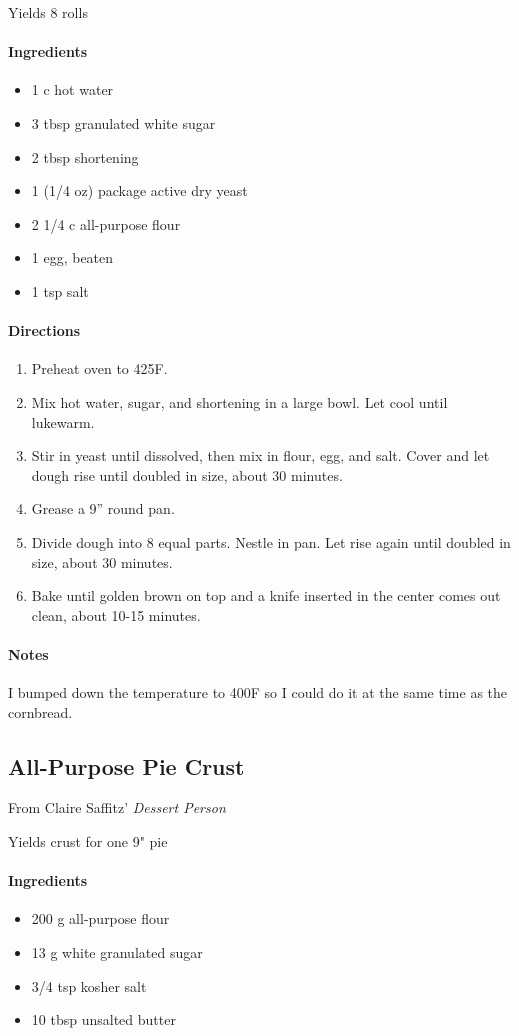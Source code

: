 \documentclass[12pt]{article}
\newenvironment*{ingredients}
	{
		\paragraph*{Ingredients}
		\begin{itemize}
	}
	{
		\end{itemize}
	}
\newenvironment*{directions}
	{
		\paragraph*{Directions}
		\begin{enumerate}
	}
	{
		\end{enumerate}
	}
\newenvironment*{notes}
	{
		\paragraph*{Notes}
		\begin{adjustwidth}{1cm}{}
	}
	{
		\end{adjustwidth}
	}
\begin{document}
	Yields 8 rolls
	
	\begin{ingredients}
		\item 1 c hot water
		\item 3 tbsp granulated white sugar
		\item 2 tbsp shortening
		\item 1 (1/4 oz) package active dry yeast
		\item 2 1/4 c all-purpose flour
		\item 1 egg, beaten
		\item 1 tsp salt
	\end{ingredients}
	
	\begin{directions}
		\item Preheat oven to 425F.
		\item Mix hot water, sugar, and shortening in a large bowl. Let cool until lukewarm.
		\item Stir in yeast until dissolved, then mix in flour, egg, and salt. Cover and let dough rise until doubled in size, about 30 minutes.
		\item Grease a 9” round pan.
		\item Divide dough into 8 equal parts. Nestle in pan. Let rise again until doubled in size, about 30 minutes.
		\item Bake until golden brown on top and a knife inserted in the center comes out clean, about 10-15 minutes.
	\end{directions}
	
	\begin{notes}
		I bumped down the temperature to 400F so I could do it at the same time as the cornbread.
	\end{notes}
	
	\newpage
	
	\subsection{All-Purpose Pie Crust}\label{sec:pie_crust}
	From Claire Saffitz' \textit{Dessert Person}
	
	Yields crust for one 9" pie
	
	\begin{ingredients}
		\item 200 g all-purpose flour
		\item 13 g white granulated sugar
		\item 3/4 tsp kosher salt
		\item 10 tbsp unsalted butter
	\end{ingredients}
	
\end{document}
